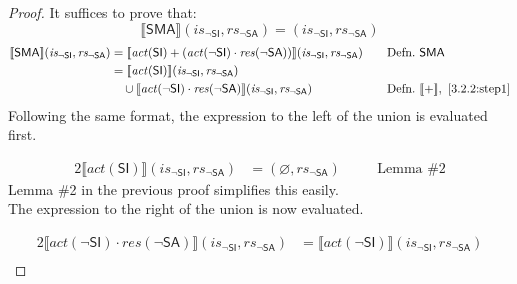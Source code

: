 \documentclass[12pt, letterpaper]{article}
\let\emptyset\varnothing
\newcommand\interp[1]{\llbracket #1 \rrbracket}
\begin{document}
 \begin{proof}
 It suffices to prove that:
     \[
     \interp{ \mathsf{SMA} } (\mathit{is_{\mathsf{\neg SI}}}, \mathit{rs_{\mathsf{\neg SA}}})
     =
     (\mathit{is_{\mathsf{\neg SI}}}, \mathit{rs_{\mathsf{\neg SA}}})
     \]
 {\fontsize{10pt}{12pt}\selectfont
 \begin{alignat}{2}
     \setcounter{equation}{0}
     \label{3.2.2:step1}
     \interp{ \mathsf{SMA} } (\mathit{is_{\mathsf{\neg SI}}}, \mathit{rs_{\mathsf{\neg SA}}})
     &=
     \interp{ \mathit{act}(\mathsf{SI}) +
     (\mathit{act}(\neg\mathsf{SI}) \cdot
      \mathit{res}(\neg\mathsf{SA}))  } (\mathit{is_{\mathsf{\neg SI}}}, \mathit{rs_{\mathsf{\neg SA}}})
     &&\quad \text{Defn.}\ \mathsf{SMA}
     \\
     \label{3.2.2:step2}
     &=
     \interp{ \mathit{act}(\mathsf{SI}) } (\mathit{is_{\mathsf{\neg SI}}}, \mathit{rs_{\mathsf{\neg SA}}}) \\
     \nonumber
     &\quad \cup %
     \interp{ \mathit{act}(\neg\mathsf{SI}) \cdot
      \mathit{res}(\neg\mathsf{SA}) } (\mathit{is_{\mathsf{\neg SI}}}, \mathit{rs_{\mathsf{\neg SA}}})
     &&\quad \text{Defn.}\ \interp{+},\ \ref{3.2.2:step1}
 \end{alignat}
 }%
     Following the same format, the expression to the left of the union is evaluated first.
 \par\nobreak
 {\fontsize{10pt}{12pt}\selectfont
 \begin{alignat}{2}
     \label{3.2.2:step3}
     \interp{ \mathit{act}(\mathsf{SI}) } (\mathit{is_{\mathsf{\neg SI}}}, \mathit{rs_{\mathsf{\neg SA}}})
     &=
     (\emptyset, \mathit{rs_{\mathsf{\neg SA}}})
     &&\quad \text{Lemma \#2}
 \end{alignat}
 }%
     Lemma \#2 in the previous proof simplifies this easily.\\
     The expression to the right of the union is now evaluated.
 \par\nobreak
 {\fontsize{10pt}{12pt}\selectfont
 \begin{alignat}{2}
     \label{3.2.2:step4}
     \interp{ \mathit{act}(\neg\mathsf{SI}) \cdot
      \mathit{res}(\neg\mathsf{SA}) } (\mathit{is_{\mathsf{\neg SI}}}, \mathit{rs_{\mathsf{\neg SA}}})
     &=
     \interp{ \mathit{act}(\neg\mathsf{SI}) } (\mathit{is_{\mathsf{\neg SI}}}, \mathit{rs_{\mathsf{\neg SA}}})\\ \nonumber

\end{alignat}}
\end{proof}
\end{document}
